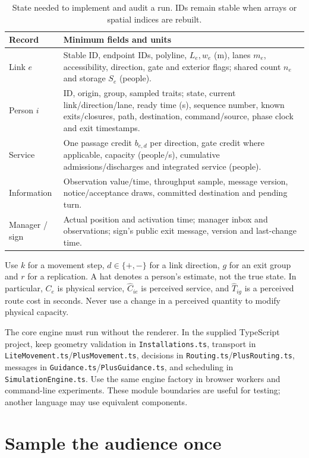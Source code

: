 \documentclass[11pt,a4paper]{article}
\newcommand{\code}[1]{{\small\nolinkurl{#1}}}
\begin{document}
\begin{table}[htbp]\centering\small
\begin{tabular}{@{}p{.19\linewidth}p{.74\linewidth}@{}}\toprule
Record & Minimum fields and units\\\midrule
Link $e$ & Stable ID, endpoint IDs, polyline, $L_e,w_e$ (m), lanes $m_e$, accessibility, direction, gate and exterior flags; shared count $n_e$ and storage $S_e$ (people).\\
Person $i$ & ID, origin, group, sampled traits; state, current link/direction/lane, ready time (s), sequence number, known exits/closures, path, destination, command/source, phase clock and exit timestamps.\\
Service & One passage credit $b_{e,d}$ per direction, gate credit where applicable, capacity (people/s), cumulative admissions/discharges and integrated service (people).\\
Information & Observation value/time, throughput sample, message version, notice/acceptance draws, committed destination and pending turn.\\
Manager / sign & Actual position and activation time; manager inbox and observations; sign's public exit message, version and last-change time.\\\bottomrule
\end{tabular}
\caption{State needed to implement and audit a run. IDs remain stable when arrays or spatial indices are rebuilt.}
\label{tab:state}
\end{table}

Use $k$ for a movement step, $d\in\{+,-\}$ for a link direction, $g$ for an exit group and $r$ for a replication. A hat denotes a person's estimate, not the true state. In particular, $C_e$ is physical service, $\widehat C_{ie}$ is perceived service, and $\widehat T_{ig}$ is a perceived route cost in seconds. Never use a change in a perceived quantity to modify physical capacity.

The core engine must run without the renderer. In the supplied TypeScript project, keep geometry validation in \code{Installations.ts}, transport in \code{LiteMovement.ts}/\code{PlusMovement.ts}, decisions in \code{Routing.ts}/\code{PlusRouting.ts}, messages in \code{Guidance.ts}/\code{PlusGuidance.ts}, and scheduling in \code{SimulationEngine.ts}. Use the same engine factory in browser workers and command-line experiments. These module boundaries are useful for testing; another language may use equivalent components.

\section{Sample the audience once}
\end{document}
